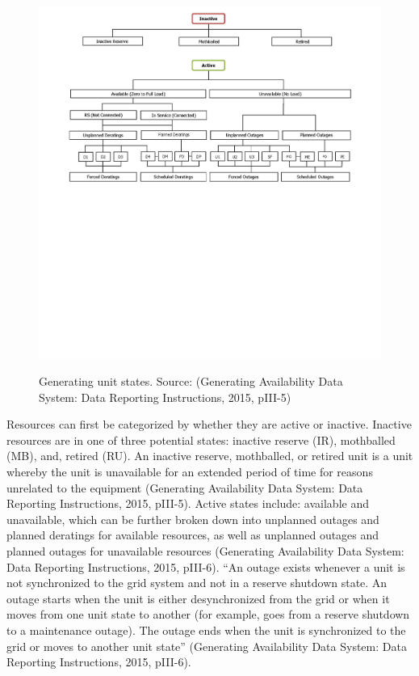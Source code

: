 \documentclass[10pt]{amsart}
\begin{document}
	\begin{figure}[H]
		\centering
		\caption{Generating unit states. Source: \parencite{}(Generating Availability Data System: Data Reporting Instructions, 2015, pIII-5)}
		\includegraphics[scale = 0.550]{unit_states_GADS.png}
		\label{fig:unit.states.GADS}
	\end{figure}
	
	Resources can first be categorized by whether they are active or inactive.
	Inactive resources are in one of three potential states: inactive reserve (IR), mothballed (MB), and, retired (RU). 
	An inactive reserve, mothballed, or retired unit is a unit whereby the unit is unavailable for an extended period of time for reasons unrelated to the equipment \parencite{}(Generating Availability Data System: Data Reporting Instructions, 2015, pIII-5). 
	Active states include: available and unavailable, which can be further broken down into unplanned outages and planned deratings for available resources, as well as unplanned outages and planned outages for unavailable resources \parencite{} (Generating Availability Data System: Data Reporting Instructions, 2015, pIII-6). 
	``An outage exists whenever a unit is not synchronized to the grid system and not in a reserve shutdown state. 
	An outage starts when the unit is either desynchronized from the grid or when it moves from one unit state to another (for example, goes from a reserve shutdown to a maintenance outage). 
	The outage ends when the unit is synchronized to the grid or moves to another unit state'' (Generating Availability Data System: Data Reporting Instructions, 2015, pIII-6). 
	
\end{document}
